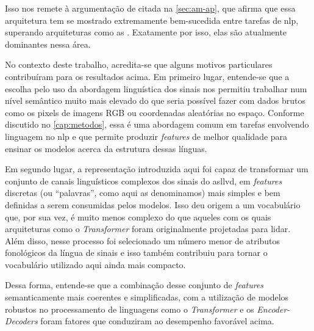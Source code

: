 Isso nos remete à argumentação de  citada na \autoref{sec:am-ap}, que afirma que essa arquitetura tem se mostrado extremamente bem-sucedida entre tarefas de \acrfull{nlp}, superando arquiteturas como as . Exatamente por isso, elas são atualmente dominantes nessa área.

No contexto deste trabalho, acredita-se que alguns motivos particulares contribuíram para os resultados acima.
Em primeiro lugar, entende-se que a escolha pelo uso da abordagem linguística dos sinais nos permitiu trabalhar num nível semântico muito mais elevado do que seria possível fazer com dados brutos como os pixels de imagens RGB ou coordenadas aleatórias no espaço. Conforme discutido no \autoref{cap:metodos}, essa é uma abordagem comum em tarefas envolvendo linguagem no \acrshort{nlp} e que permite produzir \textit{features} de melhor qualidade para ensinar os modelos acerca da estrutura dessas línguas.

Em segundo lugar, a representação introduzida aqui foi capaz de transformar um conjunto de canais linguísticos complexos dos sinais do \acrshort{asllvd}, em \textit{features} discretas (ou ``palavras'', como aqui as denominamos) mais simples e bem definidas a serem consumidas pelos modelos.
Isso deu origem a um vocabulário que, por sua vez, é muito menos complexo do que aqueles com os quais arquiteturas como o \textit{Transformer} foram originalmente projetadas para lidar. Além disso, nesse processo foi selecionado um número menor de atributos fonológicos da língua de sinais e isso também contribuiu para tornar o vocabulário utilizado aqui ainda mais compacto.

Dessa forma, entende-se que a combinação desse conjunto de \textit{features} semanticamente mais coerentes e simplificadas, com a utilização de modelos robustos no processamento de linguagens como o \textit{Transformer} e os \textit{Encoder-Decoders} foram fatores que conduziram ao desempenho favorável acima.







